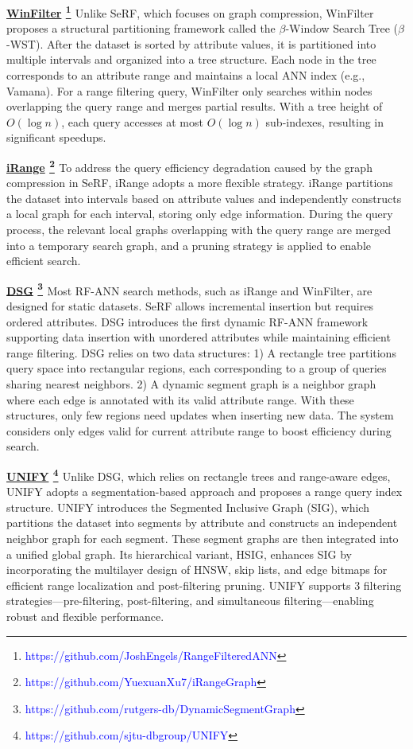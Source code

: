 \documentclass[sigconf, nonacm]{acmart}
\begin{document}
{	\noindent\textbf{\underline{WinFilter} \footnote{\textcolor{blue}{https://github.com/JoshEngels/RangeFilteredANN}} \cite{winFilter}}
	Unlike SeRF, which focuses on graph compression, WinFilter proposes a structural partitioning framework called the $\beta$-Window Search Tree ($\beta$-WST). After the dataset is sorted by attribute values, it is partitioned into multiple intervals and organized into a tree structure. Each node in the tree corresponds to an attribute range and maintains a local ANN index (e.g., Vamana). For a range filtering query, WinFilter only searches within nodes overlapping the query range and merges partial results. With a tree height of $O(\log n)$, each query accesses at most $O(\log n)$ sub-indexes, resulting in significant speedups.
	
	\noindent\textbf{\underline{iRange} \footnote{\textcolor{blue}{https://github.com/YuexuanXu7/iRangeGraph}} \cite{iRangeGraph}}
	To address the query efficiency degradation caused by the graph compression in SeRF, iRange adopts a more flexible strategy.
	iRange partitions the dataset into intervals based on attribute values and independently constructs a local graph for each interval, storing only edge information. During the query process, the relevant local graphs overlapping with the query range are merged into a temporary search graph, and a pruning strategy is applied to enable efficient search.
	
	\noindent\textbf{\underline{DSG} \footnote{\textcolor{blue}{https://github.com/rutgers-db/DynamicSegmentGraph}} \cite{DSG}}
	Most RF-ANN search methods, such as iRange and WinFilter, are designed for static datasets. SeRF allows incremental insertion but requires ordered attributes. DSG introduces the first dynamic RF-ANN framework supporting data insertion with unordered attributes while maintaining efficient range filtering.
	DSG relies on two data structures: 1) A rectangle tree partitions query space into rectangular regions, each corresponding to a group of queries sharing nearest neighbors. 2) A dynamic segment graph is a neighbor graph where each edge is annotated with its valid attribute range.
	With these structures, only few regions need updates when inserting new data. The system considers only edges valid for current attribute range to boost efficiency during search.
	
	\noindent\textbf{\underline{UNIFY} \footnote{\textcolor{blue}{https://github.com/sjtu-dbgroup/UNIFY}} \cite{UNIFY}}
	Unlike DSG, which relies on rectangle trees and range-aware edges, UNIFY adopts a segmentation-based approach and proposes a range query index structure. UNIFY introduces the Segmented Inclusive Graph (SIG), which partitions the dataset into segments by attribute and constructs an independent neighbor graph for each segment. These segment graphs are then integrated into a unified global graph. Its hierarchical variant, HSIG, enhances SIG by incorporating the multilayer design of HNSW, skip lists, and edge bitmaps for efficient range localization and post-filtering pruning. UNIFY supports 3 filtering strategies—pre-filtering, post-filtering, and  simultaneous filtering—enabling robust and flexible performance.
	
}
\end{document}
